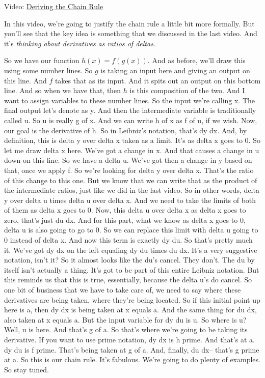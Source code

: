 \documentclass[pdftex, brazil, 12pt, twoside]{article}
\begin{document}
Video: \href{https://www.youtube.com/watch?v=kbYVRmQdX9E}{Deriving the Chain Rule}

In this video, we're going to justify the chain rule
a little bit more formally.
But you'll see that the key idea is something that we
discussed in the last video.
And it's \emph{thinking about derivatives
  as ratios of deltas}.

So we have our function $h(x) = f(g(x))$.
And as before, we'll draw this using some number lines.
So $g$ is taking an input here and giving an output on this line.
And $f$ takes that as its input.
And it spits out an output on this bottom line.
And so when we have that, then $h$ is this composition of the two.
And I want to assign variables to these number lines.
So the input we're calling x.
The final output let's denote as y.
And then the intermediate variable
is traditionally called u.
So u is really g of x.
And we can write h of x as f of u, if we wish.
Now, our goal is the derivative of h.
So in Leibniz's notation, that's dy dx.
And, by definition, this is delta y
over delta x taken as a limit.
It's as delta x goes to 0.
So let me draw delta x here.
We've got a change in x.
And that causes a change in u down on this line.
So we have a delta u.
We've got then a change in y based on that, once we apply f.
So we're looking for delta y over delta x.
That's the ratio of this change to this one.
But we know that we can write that
as the product of the intermediate ratios,
just like we did in the last video.
So in other words, delta y over delta u times delta
u over delta x.
And we need to take the limits of both of them
as delta x goes to 0.
Now, this delta u over delta x as delta x goes
to zero, that's just du dx.
And for this part, what we know as delta x goes to 0,
delta u is also going to go to 0.
So we can replace this limit with delta u
going to 0 instead of delta x.
And now this term is exactly dy du.
So that's pretty much it.
We've got dy dx on the left equaling dy du times du dx.
It's a very suggestive notation, isn't it?
So it almost looks like the du's cancel.
They don't.
The du by itself isn't actually a thing.
It's got to be part of this entire Leibniz notation.
But this reminds us that this is true, essentially,
because the delta u's do cancel.
So one bit of business that we have to take care of,
we need to say where these derivatives are being taken,
where they're being located.
So if this initial point up here is a,
then dy dx is being taken at x equals a.
And the same thing for du dx, also taken at x equals a.
But the input variable for dy du is u.
So where is u?
Well, u is here.
And that's g of a.
So that's where we're going to be taking its derivative.
If you want to use prime notation, dy dx is h prime.
And that's at a.
dy du is f prime.
That's being taken at g of a.
And, finally, du dx-- that's g prime at a.
So this is our chain rule.
It's fabulous.
We're going to do plenty of examples.
So stay tuned.
\end{document}
